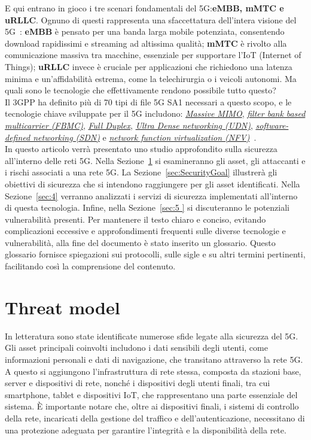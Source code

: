\documentclass[english]{article}
\begin{document}
E qui entrano in gioco i tre scenari fondamentali del 5G:\@ \textbf{eMBB, mMTC
	e uRLLC}. Ognuno di questi rappresenta una sfaccettatura dell'intera visione
del 5G~\cite{Ji2018Overview}: \textbf{eMBB} è pensato per una banda larga
mobile potenziata, consentendo download rapidissimi e streaming ad altissima
qualità; \textbf{mMTC} è rivolto alla comunicazione massiva tra macchine,
essenziale per supportare l’IoT (Internet of Things); \textbf{uRLLC} invece è
cruciale per applicazioni che richiedono una latenza minima e un'affidabilità
estrema, come la telechirurgia o i veicoli autonomi. Ma quali sono le
tecnologie che effettivamente rendono possibile tutto questo? \\ \sloppy Il
3GPP ha definito più di 70 tipi di file 5G SA1 necessari a questo scopo, e le
tecnologie chiave sviluppate per il 5G includono:
\textit{\hyperlink{MIMO}{Massive MIMO}}, \textit{\hyperlink{FBMC}{filter bank
		based multicarrier (FBMC)}}, \textit{\hyperlink{FullDuplex}{Full Duplex}},
\textit{\hyperlink{UDN}{Ultra Dense networking (UDN)}},
\textit{\hyperlink{SDN}{software-defined networking (SDN)}} e
\textit{\hyperlink{NFV}{network function virtualization
		(NFV)}}~\cite{Ji2018Overview}. \\ In questo articolo verrà presentato uno
studio approfondito sulla sicurezza all'interno delle reti 5G. Nella
Sezione~\ref{sec:ThreatModel} si esamineranno gli asset, gli attaccanti e i
rischi associati a una rete 5G. La Sezione~\ref{sec:SecurityGoal} illustrerà
gli obiettivi di sicurezza che si intendono raggiungere per gli asset
identificati. Nella Sezione~\ref{sec:4} verranno analizzati i servizi di
sicurezza implementati all'interno di questa tecnologia. Infine, nella
Sezione~\ref{sec:5 } si discuteranno le potenziali vulnerabilità presenti. Per
mantenere il testo chiaro e conciso, evitando complicazioni eccessive e
approfondimenti frequenti sulle diverse tecnologie e vulnerabilità, alla fine
del documento è stato inserito un glossario. Questo glossario fornisce
spiegazioni sui protocolli, sulle sigle e su altri termini pertinenti,
facilitando così la comprensione del contenuto.
\section{Threat model}\label{sec:ThreatModel}
In letteratura sono state identificate numerose sfide legate alla sicurezza del
5G. Gli asset principali coinvolti includono i dati sensibili degli utenti,
come informazioni personali e dati di navigazione, che transitano attraverso la
rete 5G. A questo si aggiungono l'infrastruttura di rete stessa, composta da
stazioni base, server e dispositivi di rete, nonché i dispositivi degli utenti
finali, tra cui smartphone, tablet e dispositivi IoT, che rappresentano una
parte essenziale del sistema. È importante notare che, oltre ai dispositivi
finali, i sistemi di controllo della rete, incaricati della gestione del
traffico e dell'autenticazione, necessitano di una protezione adeguata per
garantire l'integrità e la disponibilità della rete.
\end{document}
